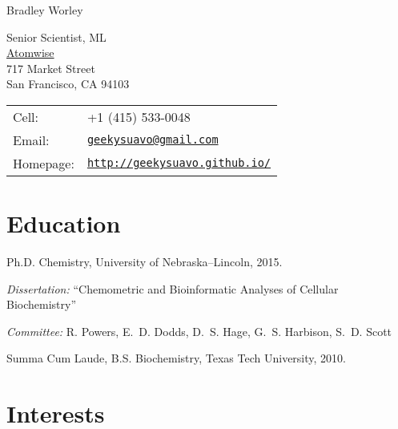 \documentclass[letterpaper]{article}
\def\name{Bradley Worley}
\renewenvironment{itemize}{
  \begin{list}{}{
    \setlength{\leftmargin}{1.5em}
  }
}{
  \end{list}
}
\begin{document}
{\huge \name}
\vspace{0.25in}

\begin{minipage}{0.45\linewidth}
  Senior Scientist, ML \\
  \href{http://www.atomwise.com/}{Atomwise} \\
  717 Market Street \\
  San Francisco, CA 94103
\end{minipage}
\begin{minipage}{0.45\linewidth}
  \begin{tabular}{ll}
    Cell: &  +1 (415) 533-0048 \\
    Email: & \href{mailto:geekysuavo@gmail.com}
                     {\tt geekysuavo@gmail.com} \\
    Homepage: & \href{http://geekysuavo.github.io/}
                 {\tt http://geekysuavo.github.io/} \\
  \end{tabular}
\end{minipage}


\section*{Education}

\begin{itemize}
  \item Ph.D. Chemistry, University of Nebraska--Lincoln, 2015.
  \begin{itemize}
    \item \emph{Dissertation:} ``Chemometric and Bioinformatic Analyses
      of Cellular Biochemistry''
    \item \emph{Committee:}
      R. Powers, E.~D. Dodds, D.~S. Hage,
      G.~S. Harbison, S.~D. Scott
  \end{itemize}
  \item Summa Cum Laude, B.S. Biochemistry, Texas Tech University, 2010.
\end{itemize}


\section*{Interests}
\end{document}
